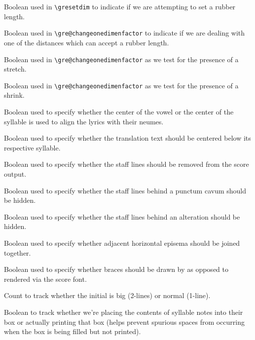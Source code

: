 Boolean used in \verb=\gresetdim= to indicate if we are attempting to set a rubber length.

Boolean used in \verb=\gre@changeonedimenfactor= to indicate if we are dealing with one of the distances which can accept a rubber length.

Boolean used in \verb=\gre@changeonedimenfactor= as we test for the presence of a stretch.

Boolean used in \verb=\gre@changeonedimenfactor= as we test for the presence of a shrink.

Boolean used to specify whether the center of the vowel or the center of the syllable is used to align the lyrics with their neumes.

Boolean used to specify whether the translation text should be centered below its respective syllable.

Boolean used to specify whether the staff lines should be removed from the score output.

Boolean used to specify whether the staff lines behind a punctum cavum should be hidden.

Boolean used to specify whether the staff lines behind an alteration should be hidden.

Boolean used to specify whether adjacent horizontal episema should be joined together.

Boolean used to specify whether braces should be drawn by \MP{} as
opposed to rendered via the score font.

Count to track whether the initial is big (2-lines) or normal (1-line).

Boolean to track whether we're placing the contents of syllable notes into their box or actually printing that box (helps prevent spurious spaces from occurring when the box is being filled but not printed).

